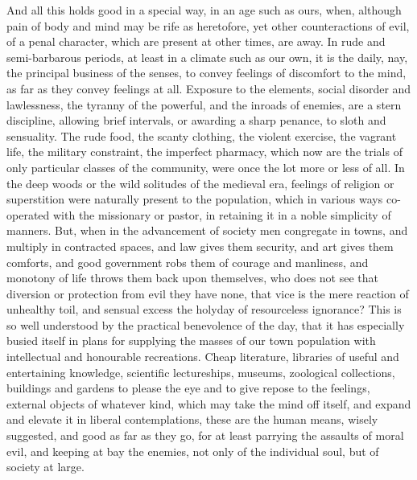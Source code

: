 And all this holds good in a special way, in an age such as ours,
when, although pain of body and mind may be rife as heretofore, yet
other counteractions of evil, of a penal character, which are present
at other times, are away. In rude and semi-barbarous periods, at least
in a climate such as our own, it is the daily, nay, the principal
business of the senses, to convey feelings of discomfort to the mind,
as far as they convey feelings at all. Exposure to the elements,
social disorder and lawlessness, the tyranny of the powerful, and the
inroads of enemies, are a stern discipline, allowing brief intervals,
or awarding a sharp penance, to sloth and sensuality. The rude food,
the scanty clothing, the violent exercise, the vagrant life, the
military constraint, the imperfect pharmacy, which now are the trials
of only particular classes of the community, were once the lot more or
less of all. In the deep woods or the wild solitudes of the medieval
era, feelings of religion or superstition were naturally present to
the population, which in various ways co-operated with the missionary
or pastor, in retaining it in a noble simplicity of manners. But, when
in the advancement of society men congregate in towns, and
multiply in contracted spaces, and law gives them security, and art
gives them comforts, and good government robs them of courage and
manliness, and monotony of life throws them back upon themselves, who
does not see that diversion or protection from evil they have none,
that vice is the mere reaction of unhealthy toil, and sensual excess
the holyday of resourceless ignorance? This is so well understood by
the practical benevolence of the day, that it has especially busied
itself in plans for supplying the masses of our town population with
intellectual and honourable recreations. Cheap literature, libraries
of useful and entertaining knowledge, scientific lectureships,
museums, zoological collections, buildings and gardens to please the
eye and to give repose to the feelings, external objects of whatever
kind, which may take the mind off itself, and expand and elevate it in
liberal contemplations, these are the human means, wisely suggested,
and good as far as they go, for at least parrying the assaults of
moral evil, and keeping at bay the enemies, not only of the individual
soul, but of society at large.


